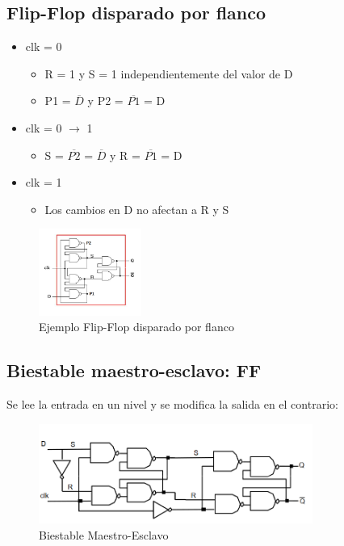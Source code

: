 \subsection{Flip-Flop disparado por flanco}
\begin{multicols}{2}
	\begin{itemize}
		\item clk = 0
		      \begin{itemize}
			      \item R = 1 y S = 1 independientemente del valor de D
			      \item P1 = $\overline{D}$ y P2 = $\overline{P1}$ = D
		      \end{itemize}
		\item clk = 0 $\rightarrow$ 1
		      \begin{itemize}
			      \item S = $\overline{P2}$ = $\overline{D}$ y R = $\overline{P1}$ = D
		      \end{itemize}
		\item clk = 1
		      \begin{itemize}
			      \item Los cambios en D no afectan a R y S
		      \end{itemize}
	\end{itemize}
	\vfill
	\null
	\begin{figure}[H]
		\centering
		\includegraphics[width = 0.3\textwidth]{images/Tema_4/Flip_Flop_Flanco.PNG}
		\caption{Ejemplo Flip-Flop disparado por flanco}
	\end{figure}
\end{multicols}

\subsection{Biestable maestro-esclavo: FF}
Se lee la entrada en un nivel y se modifica la salida en el contrario:
\begin{figure}[H]
	\centering
	\includegraphics[width=0.8\textwidth]{images/Tema_4/Biestable_Maestro_Esclavo.PNG}
	\caption{Biestable Maestro-Esclavo}
\end{figure}

